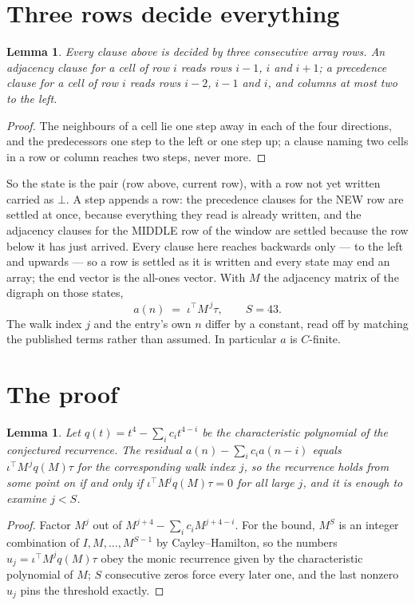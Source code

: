 \documentclass[11pt,a4paper]{article}
\theoremstyle{plain}
\newtheorem{lemma}[theorem]{Lemma}
\theoremstyle{definition}
\begin{document}
\section{Three rows decide everything}

\begin{lemma}\label{lem:win}
Every clause above is decided by three consecutive array rows. An adjacency clause for a cell
of row $i$ reads rows $i-1$, $i$ and $i+1$; a precedence clause for a cell of row $i$ reads
rows $i-2$, $i-1$ and $i$, and columns at most two to the left.
\end{lemma}

\begin{proof}
The neighbours of a cell lie one step away in each of the four directions, and the predecessors
one step to the left or one step up; a clause naming two cells in a row or column reaches two
steps, never more.
\end{proof}

So the state is the pair (row above, current row), with a row not yet written carried as
$\bot$. A step appends a row: the precedence clauses for the NEW row are settled at once,
because everything they read is already written, and the adjacency clauses for the MIDDLE row
of the window are settled because the row below it has just arrived. Every clause here reaches backwards only --- to the left and upwards --- so a
row is settled as it is written and every state may end an array; the end vector is the
all-ones vector. With $M$ the
adjacency matrix of the digraph on those states,
\[
a(n)\;=\;\iota^{\!\top}M^{\,j}\tau ,\qquad S=43.
\]
The walk index $j$ and the entry's own $n$ differ by a constant, read off by matching the
published terms rather than assumed. In particular $a$ is $C$-finite.

\section{The proof}

\begin{lemma}\label{lem:crit}
Let $q(t)=t^{4}-\sum_i c_it^{4-i}$ be the characteristic polynomial of the
conjectured recurrence. The residual $a(n)-\sum_ic_ia(n-i)$ equals
$\iota^{\!\top}M^{\,j}q(M)\tau$ for the corresponding walk index $j$, so the recurrence
holds from some point on if and only if $\iota^{\!\top}M^{j}q(M)\tau=0$ for all large $j$,
and it is enough to examine $j<S$.
\end{lemma}

\begin{proof}
Factor $M^{j}$ out of $M^{j+4}-\sum_ic_iM^{j+4-i}$. For the bound, $M^{S}$
is an integer combination of $I,M,\dots,M^{S-1}$ by Cayley--Hamilton, so the numbers
$u_j=\iota^{\!\top}M^{j}q(M)\tau$ obey the monic recurrence given by the characteristic
polynomial of $M$; $S$ consecutive zeros force every later one, and the last nonzero $u_j$
pins the threshold exactly.
\end{proof}
\end{document}
